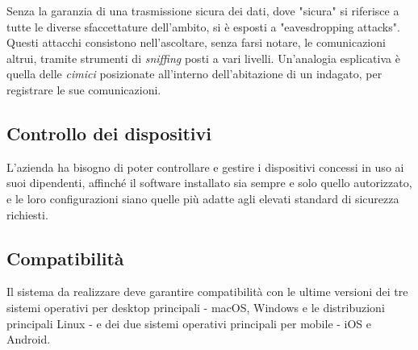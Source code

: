 Senza la garanzia di una trasmissione sicura dei dati, dove "sicura" si riferisce a tutte le diverse sfaccettature dell'ambito, si è esposti a "eavesdropping attacks". Questi attacchi consistono nell'ascoltare, senza farsi notare, le comunicazioni altrui, tramite strumenti di \emph{sniffing} posti a vari livelli. Un'analogia esplicativa è quella delle \emph{cimici} posizionate all'interno dell'abitazione di un indagato, per registrare le sue comunicazioni.

\subsection{Controllo dei dispositivi}
L'azienda ha bisogno di poter controllare e gestire i dispositivi concessi in uso ai suoi dipendenti, affinché il software installato sia sempre e solo quello autorizzato, e le loro configurazioni siano quelle più adatte agli elevati standard di sicurezza richiesti.

\subsection{Compatibilità}
Il sistema da realizzare deve garantire compatibilità con le ultime versioni dei tre sistemi operativi per desktop principali - macOS, Windows e le distribuzioni principali Linux -  e dei due sistemi operativi principali per mobile - iOS e Android.